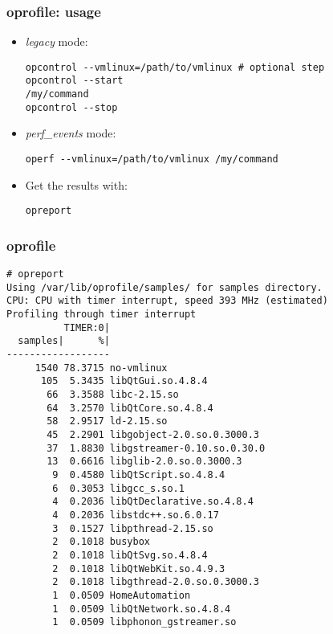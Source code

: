 \begin{frame}[fragile]
\frametitle{oprofile: usage}
\begin{itemize}
	\item {\em legacy} mode:
	\begin{block}{}
\begin{verbatim}
opcontrol --vmlinux=/path/to/vmlinux # optional step
opcontrol --start
/my/command
opcontrol --stop
\end{verbatim}
	\end{block}
	\item {\em perf\_events} mode:
	\begin{block}{}
\begin{verbatim}
operf --vmlinux=/path/to/vmlinux /my/command
\end{verbatim}
	\end{block}
	\item Get the results with:
	\begin{block}{}
\begin{verbatim}
opreport
\end{verbatim}
	\end{block}
\end{itemize}
\end{frame}

\begin{frame}[fragile]
\frametitle{oprofile}
\begin{block}{}
\tiny
\begin{verbatim}
# opreport
Using /var/lib/oprofile/samples/ for samples directory.
CPU: CPU with timer interrupt, speed 393 MHz (estimated)
Profiling through timer interrupt
          TIMER:0|
  samples|      %|
------------------
     1540 78.3715 no-vmlinux
      105  5.3435 libQtGui.so.4.8.4
       66  3.3588 libc-2.15.so
       64  3.2570 libQtCore.so.4.8.4
       58  2.9517 ld-2.15.so
       45  2.2901 libgobject-2.0.so.0.3000.3
       37  1.8830 libgstreamer-0.10.so.0.30.0
       13  0.6616 libglib-2.0.so.0.3000.3
        9  0.4580 libQtScript.so.4.8.4
        6  0.3053 libgcc_s.so.1
        4  0.2036 libQtDeclarative.so.4.8.4
        4  0.2036 libstdc++.so.6.0.17
        3  0.1527 libpthread-2.15.so
        2  0.1018 busybox
        2  0.1018 libQtSvg.so.4.8.4
        2  0.1018 libQtWebKit.so.4.9.3
        2  0.1018 libgthread-2.0.so.0.3000.3
        1  0.0509 HomeAutomation
        1  0.0509 libQtNetwork.so.4.8.4
        1  0.0509 libphonon_gstreamer.so
\end{verbatim}
\end{block}
\end{frame}

